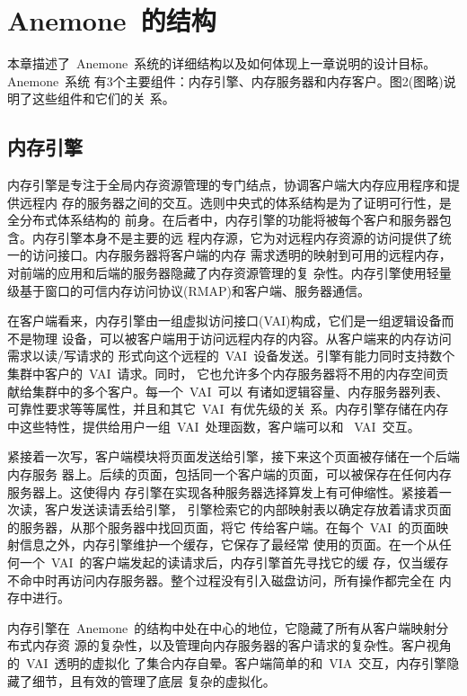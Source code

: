 \documentclass[dvipdfm, NoBUAAtitle]{BUAApaper}
\begin{document}
\section{Anemone~的结构}

本章描述了~Anemone~系统的详细结构以及如何体现上一章说明的设计目标。Anemone~系统
有3个主要组件：内存引擎、内存服务器和内存客户。图2(图略)说明了这些组件和它们的关
系。

\subsection{内存引擎}

内存引擎是专注于全局内存资源管理的专门结点，协调客户端大内存应用程序和提供远程内
存的服务器之间的交互。选则中央式的体系结构是为了证明可行性，是全分布式体系结构的
前身。在后者中，内存引擎的功能将被每个客户和服务器包含。内存引擎本身不是主要的远
程内存源，它为对远程内存资源的访问提供了统一的访问接口。内存服务器将客户端的内存
需求透明的映射到可用的远程内存，对前端的应用和后端的服务器隐藏了内存资源管理的复
杂性。内存引擎使用轻量级基于窗口的可信内存访问协议(RMAP)和客户端、服务器通信。

在客户端看来，内存引擎由一组虚拟访问接口(VAI)构成，它们是一组逻辑设备而不是物理
设备，可以被客户端用于访问远程内存的内容。从客户端来的内存访问需求以读/写请求的
形式向这个远程的~VAI~设备发送。引擎有能力同时支持数个集群中客户的~VAI~请求。同时，
它也允许多个内存服务器将不用的内存空间贡献给集群中的多个客户。每一个~VAI~可以
有诸如逻辑容量、内存服务器列表、可靠性要求等等属性，并且和其它~VAI~有优先级的关
系。内存引擎存储在内存中这些特性，提供给用户一组~VAI~处理函数，客户端可以和
~VAI~交互。

紧接着一次写，客户端模块将页面发送给引擎，接下来这个页面被存储在一个后端内存服务
器上。后续的页面，包括同一个客户端的页面，可以被保存在任何内存服务器上。这使得内
存引擎在实现各种服务器选择算发上有可伸缩性。紧接着一次读，客户发送读请丢给引擎，
引擎检索它的内部映射表以确定存放着请求页面的服务器，从那个服务器中找回页面，将它
传给客户端。在每个~VAI~的页面映射信息之外，内存引擎维护一个缓存，它保存了最经常
使用的页面。在一个从任何一个~VAI~的客户端发起的读请求后，内存引擎首先寻找它的缓
存，仅当缓存不命中时再访问内存服务器。整个过程没有引入磁盘访问，所有操作都完全在
内存中进行。

内存引擎在~Anemone~的结构中处在中心的地位，它隐藏了所有从客户端映射分布式内存资
源的复杂性，以及管理向内存服务器的客户请求的复杂性。客户视角的~VAI~透明的虚拟化
了集合内存自晕。客户端简单的和~VIA~交互，内存引擎隐藏了细节，且有效的管理了底层
复杂的虚拟化。
\end{document}
